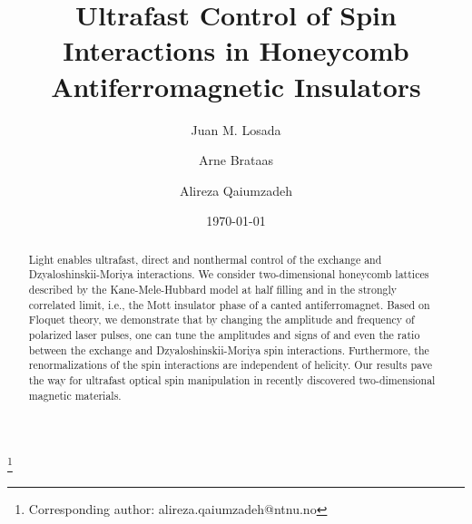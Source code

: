 \documentclass[aps,prl,twocolumn,amsmath,amssymb,nobibnotes]{revtex4-1}%
\begin{document}
\title{Ultrafast Control of Spin Interactions in  Honeycomb Antiferromagnetic Insulators}

\author{Juan M. Losada}
\author{Arne Brataas}
\author{Alireza Qaiumzadeh}
\thanks{Corresponding author: alireza.qaiumzadeh@ntnu.no}

\begin{abstract}
Light enables ultrafast, direct and nonthermal control of the exchange and Dzyaloshinskii-Moriya interactions. We consider two-dimensional honeycomb lattices described by the Kane-Mele-Hubbard model at half filling and in the strongly correlated limit, i.e., the Mott insulator phase of a canted antiferromagnet. Based on Floquet theory, we demonstrate that by changing the amplitude and frequency of polarized laser pulses, one can tune the amplitudes and signs of and even the ratio between the exchange and Dzyaloshinskii-Moriya spin interactions. Furthermore, the renormalizations of the spin interactions are independent of helicity. Our results pave the way for ultrafast optical spin manipulation in recently discovered two-dimensional magnetic materials.
\end{abstract}

\date{\today}
\maketitle
\end{document}
